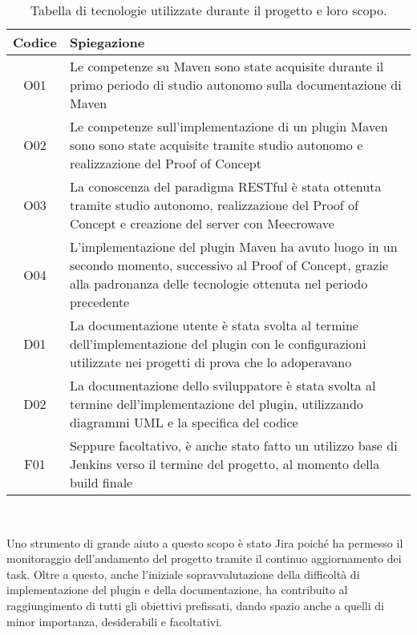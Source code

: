     \begin{table}[H]
        {\def\arraystretch{1.5}
        \begin{tabularx}{\textwidth}{cX}
            \rowcolor{beautyblue}
            \textbf{Codice} &
            \textbf{Spiegazione} \\ \hline

            O01 & Le competenze su Maven sono state acquisite durante il primo periodo di studio autonomo sulla documentazione di Maven \\
            O02 & Le competenze sull'implementazione di un plugin Maven sono sono state acquisite tramite studio autonomo e realizzazione del Proof of Concept \\
            O03 & La conoscenza del paradigma RESTful è stata ottenuta  tramite studio autonomo, realizzazione del Proof of Concept e creazione del server con Meecrowave \\
            O04 & L'implementazione del plugin Maven ha avuto luogo in un secondo momento, successivo al Proof of Concept, grazie alla padronanza delle tecnologie ottenuta nel periodo precedente \\
            D01 & La documentazione utente è stata svolta al termine dell'implementazione del plugin con le configurazioni utilizzate nei progetti di prova che lo adoperavano \\
            D02 & La documentazione dello sviluppatore è stata svolta al termine dell'implementazione del plugin, utilizzando diagrammi UML e la specifica del codice \\
            F01 & Seppure facoltativo, è anche stato fatto un utilizzo base di Jenkins verso il termine del progetto, al momento della build finale \\
            
        \end{tabularx}} \\
    \caption{Tabella di tecnologie utilizzate durante il progetto e loro scopo.}
    \label{tabellaObiettiviRaggiunti}
    \end{table}

    Uno strumento di grande aiuto a questo scopo è stato Jira poiché ha permesso il monitoraggio dell'andamento del progetto tramite il continuo aggiornamento dei task.
    Oltre a questo, anche l'iniziale sopravvalutazione della difficoltà di implementazione del plugin e della documentazione, ha contribuito al raggiungimento di tutti gli obiettivi prefissati, dando spazio anche a quelli di minor importanza, desiderabili e facoltativi. 


